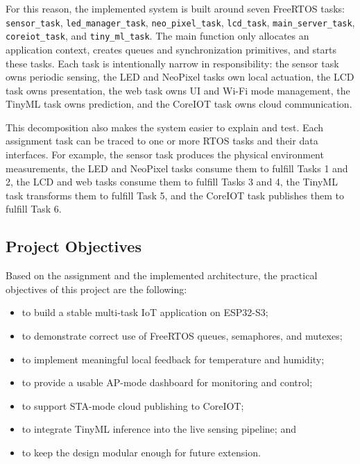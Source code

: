 For this reason, the implemented system is built around seven FreeRTOS tasks:
\texttt{sensor\_task}, \texttt{led\_manager\_task},
\texttt{neo\_pixel\_task}, \texttt{lcd\_task}, \texttt{main\_server\_task},
\texttt{coreiot\_task}, and \texttt{tiny\_ml\_task}. The main function only
allocates an application context, creates queues and synchronization primitives,
and starts these tasks. Each task is intentionally narrow in responsibility:
the sensor task owns periodic sensing, the LED and NeoPixel tasks own local
actuation, the LCD task owns presentation, the web task owns UI and Wi-Fi mode
management, the TinyML task owns prediction, and the CoreIOT task owns cloud
communication.

This decomposition also makes the system easier to explain and test. Each
assignment task can be traced to one or more RTOS tasks and their data
interfaces. For example, the sensor task produces the physical environment
measurements, the LED and NeoPixel tasks consume them to fulfill Tasks 1 and 2,
the LCD and web tasks consume them to fulfill Tasks 3 and 4, the TinyML task
transforms them to fulfill Task 5, and the CoreIOT task publishes them to
fulfill Task 6.

\subsection{Project Objectives}
Based on the assignment and the implemented architecture, the practical
objectives of this project are the following:
\begin{itemize}
  \item to build a stable multi-task IoT application on ESP32-S3;
  \item to demonstrate correct use of FreeRTOS queues, semaphores, and mutexes;
  \item to implement meaningful local feedback for temperature and humidity;
  \item to provide a usable AP-mode dashboard for monitoring and control;
  \item to support STA-mode cloud publishing to CoreIOT;
  \item to integrate TinyML inference into the live sensing pipeline; and
  \item to keep the design modular enough for future extension.
\end{itemize}


